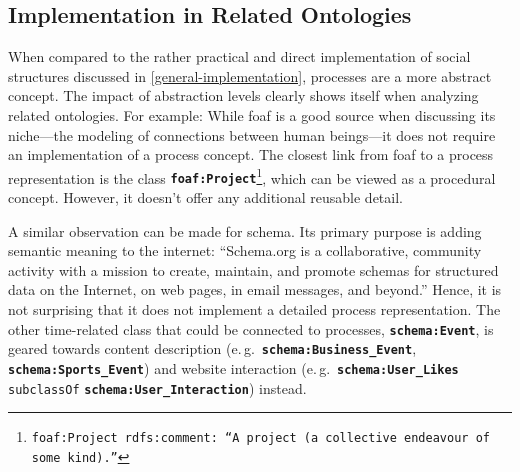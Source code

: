 \documentclass[a4paper, DIV=13, BCOR=0cm]{scrbook}
\newcommand{\eg}{e.\,g.\ }
\newcommand{\class}[1]{\texttt{\textbf{#1}}}
\newcommand{\relation}[1]{\texttt{#1}}
\newcommand{\foottt}[1]{\footnote{\texttt{#1}}}
\begin{document}
\subsection{Implementation in Related Ontologies}
When compared to the rather practical and direct implementation of social structures discussed in \autoref{general-implementation}, processes are a more abstract concept. The impact of abstraction levels clearly shows itself when analyzing related ontologies. For example: While \gls{foaf} is a good source when discussing its niche---the modeling of connections between human beings---it does not require an implementation of a process concept. The closest link from \gls{foaf} to a process representation is the  class \class{foaf:Project}\foottt{foaf:Project rdfs:comment: \enquote{A project (a collective endeavour of some kind).}}, which can be viewed as a procedural concept. However, it doesn't offer any additional reusable detail.

A similar observation can be made for \gls{schema}. Its primary purpose is adding semantic meaning to the internet: \enquote{Schema.org is a collaborative, community activity with a mission to create, maintain, and promote schemas for structured data on the Internet, on web pages, in email messages, and beyond.} \cite{schema-mission} Hence, it is not surprising that it does not implement a detailed process representation. The other time-related class that could be connected to processes, \class{schema:Event}, is geared towards content description (\eg \class{schema:Business\_Event}, \class{schema:Sports\_Event}) and website interaction (\eg \class{schema:User\_Likes} \relation{subclassOf} \class{schema:User\_Interaction}) instead.
\end{document}
